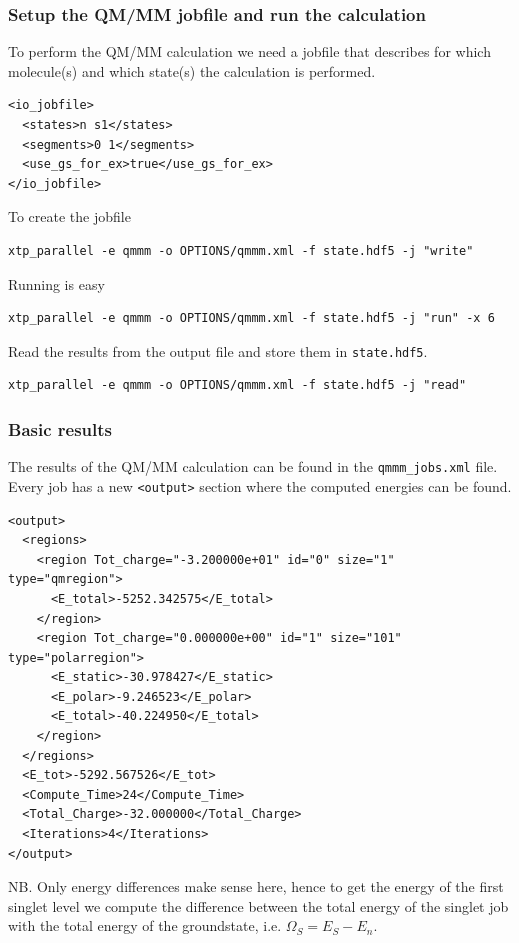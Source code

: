 \documentclass[t,aspectratio=169, 8pt]{beamer}
\begin{document}
\begin{frame}[fragile]
  \frametitle{Setup the QM/MM jobfile and run the calculation}
  To perform the QM/MM calculation we need a jobfile that describes for which molecule(s) and which state(s) the calculation is performed. 
  \begin{verbatim}
<io_jobfile>
  <states>n s1</states>
  <segments>0 1</segments>
  <use_gs_for_ex>true</use_gs_for_ex>
</io_jobfile>
  \end{verbatim}
  To create the jobfile
  \begin{verbatim}
xtp_parallel -e qmmm -o OPTIONS/qmmm.xml -f state.hdf5 -j "write"
  \end{verbatim}
  Running is easy
  \begin{verbatim}
xtp_parallel -e qmmm -o OPTIONS/qmmm.xml -f state.hdf5 -j "run" -x 6
  \end{verbatim}
  Read the results from the output file and store them in \texttt{state.hdf5}.
  \begin{verbatim}
xtp_parallel -e qmmm -o OPTIONS/qmmm.xml -f state.hdf5 -j "read"
  \end{verbatim}

\end{frame}

\begin{frame}[fragile]
  \frametitle{Basic results}
  The results of the QM/MM calculation can be found in the \texttt{qmmm_jobs.xml} file.
  \vspace{0.1cm}\\
  Every job has a new \texttt{<output>} section where the computed energies can be found.
  \begin{verbatim}
<output>
  <regions>
    <region Tot_charge="-3.200000e+01" id="0" size="1" type="qmregion">
      <E_total>-5252.342575</E_total>
    </region>
    <region Tot_charge="0.000000e+00" id="1" size="101" type="polarregion">
      <E_static>-30.978427</E_static>
      <E_polar>-9.246523</E_polar>
      <E_total>-40.224950</E_total>
    </region>
  </regions>
  <E_tot>-5292.567526</E_tot>
  <Compute_Time>24</Compute_Time>
  <Total_Charge>-32.000000</Total_Charge>
  <Iterations>4</Iterations>
</output>
  \end{verbatim}
\small
NB. Only energy differences make sense here, hence to get the energy of the first singlet level we compute the difference between the total energy of the singlet job with the total energy of the groundstate, i.e. $\Omega_S = E_S - E_n$.
\end{frame}
\end{document}
